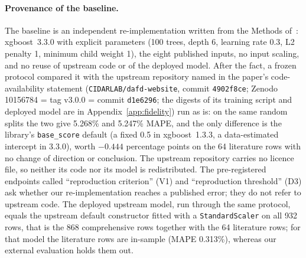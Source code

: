 \documentclass[11pt,a4paper]{article}
\begin{document}
\paragraph{Provenance of the baseline.} The baseline is an independent
re-implementation written from the Methods of~\cite{lashkaripour2024}:
xgboost~3.3.0 with explicit parameters (100 trees, depth 6, learning rate
0.3, L2 penalty 1, minimum child weight 1), the eight published inputs, no
input scaling, and no reuse of upstream code or of the deployed model. After
the fact, a frozen protocol compared it with the upstream repository named in
the paper's code-availability statement (\texttt{CIDARLAB/dafd-website},
commit \texttt{4902f8ce}; Zenodo 10156784 = tag v3.0.0 = commit
\texttt{d1e6296}; the digests of its training script and deployed model are
in Appendix~\ref{app:fidelity}) run as is: on the same random splits the two
give 5.268\% and 5.247\% MAPE, and the only difference is the library's
\texttt{base\_score} default (a fixed 0.5 in xgboost~1.3.3, a data-estimated
intercept in 3.3.0), worth $-0.444$ percentage points on the 64 literature
rows with no change of direction or conclusion. The upstream repository
carries no licence file, so neither its code nor its model is redistributed.
The pre-registered endpoints called ``reproduction criterion'' (V1) and
``reproduction threshold'' (D3) ask whether our re-implementation reaches a
published error; they do not refer to upstream code. The deployed upstream
model, run through the same protocol, equals the upstream default
constructor fitted with a \texttt{StandardScaler} on all 932 rows, that is
the 868 comprehensive rows together with the 64 literature rows; for that
model the literature rows are in-sample (MAPE 0.313\%), whereas our external
evaluation holds them out.
\end{document}
